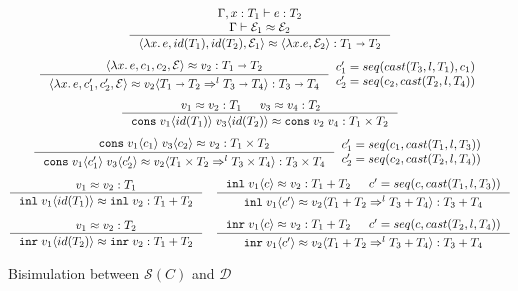 \documentclass[acmsmall,review]{acmart}\settopmatter{printfolios=true,printccs=false,printacmref=false}
\newcommand{\plus}[0]{+}
\newcommand{\POOfun}[2]{#1 \shortrightarrow #2}
\newcommand{\POOprod}[2]{#1 \times #2}
\newcommand{\POOsum}[2]{#1 \plus #2}
\newcommand{\cOOcast}[3]{#1 \Rightarrow^{#2} #3}
\newcommand{\vOOcast}[2]{#1\langle#2\rangle}
\newcommand{\vOOfun}[3]{\langle \lambda  #2. #3, #1 \rangle}
\newcommand{\vOOcons}[2]{\mathtt{cons}\;#1\;#2}
\newcommand{\vOOinl}[1]{\mathtt{inl}\;#1}
\newcommand{\vOOinr}[1]{\mathtt{inr}\;#1}
\newcommand{\hcvOOfun}[5]{\langle \lambda #3.\, #4 , #1 , #5, #2 \rangle}
\newcommand{\hcvOOcons}[4]{\mathtt{cons}\;#1\langle#2\rangle\;#3\langle#4\rangle}
\newcommand{\hcvOOinl}[2]{\mathtt{inl}\;#1\langle#2\rangle}
\newcommand{\hcvOOinr}[2]{\mathtt{inr}\;#1\langle#2\rangle}
\newcommand{\ineffCEKD}{\ensuremath{\mathcal{D}}}
\newcommand{\effCEK}[1]{\ensuremath{\mathcal{S}(#1)}}
\begin{document}
\begin{figure}
\begin{gather*}
  \inference{
  	\Gamma , x : T_1 \vdash e : T_2
  	\\
  	\Gamma \vdash \mathcal{E}_1 \approx \mathcal{E}_2
  }{
    \hcvOOfun{id(T_1)}{\mathcal{E}_1}{x}{e}{id(T_2)}
    \approx
    \vOOfun{\mathcal{E}_2}{x}{e}
    : \POOfun{T_1}{T_2}
  }
\\[1ex]
\inference{
\hcvOOfun{c_1}{\mathcal{E}}{x}{e}{c_2} \approx v_2 : \POOfun{T_1}{T_2}}{
\hcvOOfun{c_1'}{\mathcal{E}}{x}{e}{c_2'}
\approx
\vOOcast{v_2}{\cOOcast{\POOfun{T_1}{T_2}}{l}{\POOfun{T_3}{T_4}}}
: \POOfun{T_3}{T_4}
}
\begin{array}{l}
c_1' = seq(cast(T_3,l,T_1),c_1) \\
c_2' = seq(c_2,cast(T_2,l,T_4))
\end{array}
\\[1ex]
  \inference{
    v_1 \approx v_2 : T_1 &
    v_3 \approx v_4 : T_2 &
  }{
    \hcvOOcons{v_1}{id(T_1)}{v_3}{id(T_2)}
    \approx
    \vOOcons{v_2}{v_4}
    : \POOprod{T_1}{T_2}
  }
\\[1ex]
  \inference{
    \hcvOOcons{v_1}{c_1}{v_3}{c_2} \approx v_2 : \POOprod{T_1}{T_2}
  }{
    \hcvOOcons{v_1}{c_1'}{v_3}{c_2'} \approx
    \vOOcast{v_2}{\cOOcast{\POOprod{T_1}{T_2}}{l}{\POOprod{T_3}{T_4}}}
    : \POOprod{T_3}{T_4}
  }
  \begin{array}{l}
    c_1' = seq(c_1,cast(T_1,l,T_3)) \\
    c_2' = seq(c_2,cast(T_2,l,T_4))
  \end{array}
\\[1ex]
  \inference{
    v_1 \approx v_2 : T_1
  }{
    \hcvOOinl{v_1}{id(T_1)} \approx \vOOinl{v_2}
    : \POOsum{T_1}{T_2}
  }
  \quad
  \inference{
    \hcvOOinl{v_1}{c} \approx v_2
    : \POOsum{T_1}{T_2} &
    c' = seq(c,cast(T_1,l,T_3))
  }{
    \hcvOOinl{v_1}{c'} \approx
    \vOOcast{v_2}{\cOOcast{\POOsum{T_1}{T_2}}{l}{\POOsum{T_3}{T_4}}}
    : \POOsum{T_3}{T_4} 
  }
  \\[1ex]
  \inference{
  v_1 \approx v_2 : T_2
  }{
  \hcvOOinr{v_1}{id(T_2)} \approx \vOOinr{v_2}
  : \POOsum{T_1}{T_2}
  }
  \quad
  \inference{
  \hcvOOinr{v_1}{c} \approx v_2
  : \POOsum{T_1}{T_2} &
  c' = seq(c,cast(T_2,l,T_4))
  }{
  \hcvOOinr{v_1}{c'} \approx
  \vOOcast{v_2}{\cOOcast{\POOsum{T_1}{T_2}}{l}{\POOsum{T_3}{T_4}}}
  : \POOsum{T_3}{T_4}
  }
  \end{gather*}
  \caption{Bisimulation between \effCEK{C} and \ineffCEKD}
  \label{fig:bisim-SC-D}
\end{figure}
\end{document}
